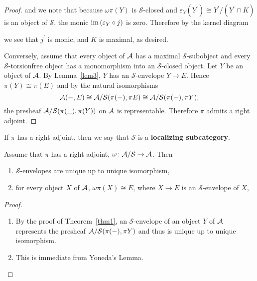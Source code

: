 \documentclass[dissertation.tex]{subfiles}
\begin{document}
\begin{thm}
\begin{proof}
    and we note that because $\omega\pi(Y)$ is $\mathcal{S}$-closed and $\varepsilon_Y(Y^\prime) \cong Y^\prime/\left(Y^\prime \cap K\right)$ is an object of $\mathcal{S}$, the monic $\operatorname{im}{(\varepsilon_Y \circ j)}$ is zero.
    Therefore by the kernel diagram
    \begin{center}
    \end{center}
    we see that $j^\prime$ is monic, and $K$ is maximal, as desired. 
    
    Conversely, assume that every object of $\mathcal{A}$ has a maximal $\mathcal{S}$-subobject and every $\mathcal{S}$-torsionfree object has a monomorphism into an $\mathcal{S}$-closed object.
    Let $Y$ be an object of $\mathcal{A}$.
    By Lemma~\ref{lem3}, $Y$ has an $\mathcal{S}$-envelope $Y \rightarrow E$.
    Hence $\pi(Y) \cong \pi(E)$ and by the natural isomorphisms
    $$\mathcal{A}(- , E) \cong \mathcal{A}/\mathcal{S}(\pi(-), \pi{E}) \cong \mathcal{A}/\mathcal{S}(\pi(-), \pi{Y}),$$
    the presheaf $\mathcal{A}/\mathcal{S}(\pi(\_), \pi(Y))$ on $\mathcal{A}$ is representable.
    Therefore $\pi$ admits a right adjoint.
  \end{proof}
\end{thm}

\begin{defn}
  If $\pi$ has a right adjoint, then we say that $\mathcal{S}$ is a \textbf{localizing subcategory}.
\end{defn}

\begin{cor}\label{cor1}
  Assume that $\pi$ has a right adjoint, $\omega \colon \mathcal{A}/\mathcal{S} \rightarrow \mathcal{A}$.
  Then 
  \begin{enumerate}
  \item
    $\mathcal{S}$-envelopes are unique up to unique isomorphism,
  \item
    for every object $X$ of $\mathcal{A}$, $\omega\pi(X) \cong E$, where $X \rightarrow E$ is an $\mathcal{S}$-envelope of $X$,
  \end{enumerate}
  \begin{proof}
    \begin{enumerate}
    \item
      By the proof of Theorem~\ref{thm1}, an $\mathcal{S}$-envelope of an object $Y$ of $\mathcal{A}$ represents the presheaf $\mathcal{A}/\mathcal{S}(\pi(-), \pi{Y})$ and thus is unique up to unique isomorphism.
    \item
      This is immediate from Yoneda's Lemma.
    \end{enumerate}
  \end{proof}
\end{cor}
\end{document}
